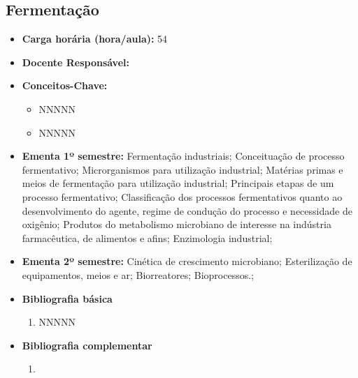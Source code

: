 \documentclass[11pt,fleqn]{book} %
\begin{document}
\subsection{Fermentação}\label{disc:fermentacao}
\begin{itemize}
	\item \textbf{Carga horária (hora/aula):} 54
	\item \textbf{Docente Responsável:}
	\item \textbf{Conceitos-Chave:}
	\begin{itemize}
		\item NNNNN
		\item NNNNN
	\end{itemize}
	\item \textbf{Ementa 1º semestre:}
	Fermentação industriais;
	Conceituação de processo fermentativo; 
	Microrganismos para utilização industrial; 
	Matérias primas e meios de fermentação para utilização industrial; 
	Principais etapas de um processo fermentativo; 
	Classificação dos processos fermentativos quanto ao desenvolvimento do agente, regime de condução do processo e necessidade de oxigênio;
	Produtos do metabolismo microbiano de interesse na indústria farmacêutica, de alimentos e afins; 
	Enzimologia industrial; 
	\item \textbf{Ementa 2º semestre:}	
	Cinética de crescimento microbiano;
	Esterilização de equipamentos, meios e ar;
	Biorreatores;
	Bioprocessos.;
	\item \textbf{Bibliografia básica}
	\begin{enumerate}
		\item NNNNN
	\end{enumerate}
	\item \textbf{Bibliografia complementar}
	\begin{enumerate}
		\item 
	\end{enumerate}	
\end{itemize}


\newpage
\end{document}
